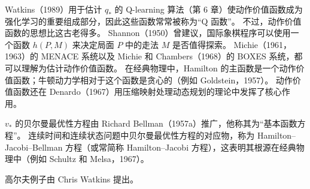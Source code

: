 \documentclass[UTF8,12pt,a4paper,fontset=fandol]{ctexart}
\begin{document}
Watkins（1989）用于估计 $q_*$ 的 Q-learning 算法（第 6 章）使动作价值函数成为强化学习的重要组成部分，因此这些函数常常被称为“Q 函数”。
不过，动作价值函数的思想比这古老得多。
Shannon（1950）曾建议，国际象棋程序可以使用一个函数 $h(P,M)$ 来决定局面 $P$ 中的走法 $M$ 是否值得探索。
Michie（1961，1963）的 MENACE 系统以及 Michie 和 Chambers（1968）的 BOXES 系统，都可以理解为估计动作价值函数。
在经典物理中，Hamilton 的主函数是一个动作价值函数；牛顿动力学相对于这个函数是贪心的（例如 Goldstein，1957）。
动作价值函数还在 Denardo（1967）用压缩映射处理动态规划的理论中发挥了核心作用。

$v_*$ 的贝尔曼最优性方程由 Richard Bellman（1957a）推广，他称其为“基本函数方程”。
连续时间和连续状态问题中贝尔曼最优性方程的对应物，称为 Hamilton--Jacobi--Bellman 方程（或常简称 Hamilton--Jacobi 方程），这表明其根源在经典物理中（例如 Schultz 和 Melsa，1967）。

高尔夫例子由 Chris Watkins 提出。
\end{document}
